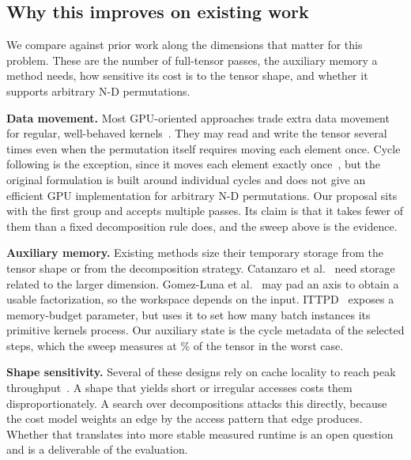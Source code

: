 
\subsection{Why this improves on existing work}
\label{sec:improvement}

We compare against prior work along the dimensions that matter for this
problem. These are the number of full-tensor passes, the auxiliary memory a
method needs, how sensitive its cost is to the tensor shape, and whether it
supports arbitrary N-D permutations.

\textbf{Data movement.} Most GPU-oriented approaches trade extra data movement
for regular, well-behaved
kernels~\cite{catanzaro2014decomposition,gomezluna2016inplace,wu2025eithot,cheng2025ittpd}.
They may read and write the tensor several times even when the permutation
itself requires moving each element once. Cycle following is the exception,
since it moves each element exactly once~\cite{gustavson2012cycleleader}, but
the original formulation is built around individual cycles and does not give
an efficient GPU implementation for arbitrary N-D permutations. Our proposal
sits with the first group and accepts multiple passes. Its claim is that it
takes fewer of them than a fixed decomposition rule does, and the sweep above
is the evidence.

\textbf{Auxiliary memory.} Existing methods size their temporary storage from
the tensor shape or from the decomposition strategy. Catanzaro et
al.~\cite{catanzaro2014decomposition} need storage related to the larger
dimension. Gomez-Luna et al.~\cite{gomezluna2016inplace} may pad an axis to
obtain a usable factorization, so the workspace depends on the input.
\textsc{ITTPD}~\cite{cheng2025ittpd} exposes a memory-budget parameter, but
uses it to set how many batch instances its primitive kernels process. Our
auxiliary state is the cycle metadata of the selected steps, which the sweep
measures at \planAuxPercent{}\% of the tensor in the worst case.

\textbf{Shape sensitivity.} Several of these designs rely on cache locality to
reach peak
throughput~\cite{catanzaro2014decomposition,gomezluna2016inplace,cheng2025ittpd}.
A shape that yields short or irregular accesses costs them disproportionately.
A search over decompositions attacks this directly, because the cost model
weights an edge by the access pattern that edge produces. Whether that
translates into more stable measured runtime is an open question and is a
deliverable of the evaluation.

